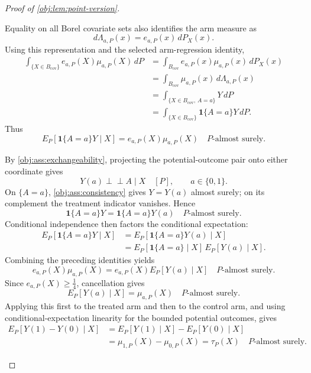 \documentclass[11pt]{article}
\begin{document}
\begin{proof}[Proof of \cref{obj:lem:point-version}]
\begin{enumerate}
Equality on all Borel covariate sets also identifies the arm measure as
\[
d\Lambda_{a,P}(x)=e_{a,P}(x)\,dP_X(x).
\]
Using this representation and the selected arm-regression identity,
\[
\begin{aligned}
\int_{\{X\in B_{\mathrm{cov}}\}}
e_{a,P}(X)\mu_{a,P}(X)\,dP
&=\int_{B_{\mathrm{cov}}}
e_{a,P}(x)\mu_{a,P}(x)\,dP_X(x)\\
&=\int_{B_{\mathrm{cov}}}\mu_{a,P}(x)\,d\Lambda_{a,P}(x)\\
&=\int_{\{X\in B_{\mathrm{cov}},\,A=a\}}Y\,dP\\
&=\int_{\{X\in B_{\mathrm{cov}}\}}\mathbf1\{A=a\}Y\,dP.
\end{aligned}
\]
Thus
\[
E_P[\mathbf1\{A=a\}Y\mid X]
=e_{a,P}(X)\mu_{a,P}(X)
\quad P\text{-almost surely}.
\]

By \cref{obj:ass:exchangeability}, projecting the potential-outcome pair onto either coordinate gives
\[
Y(a)\perp\!\!\!\perp A\mid X\quad[P],
\qquad a\in\{0,1\}.
\]
On \(\{A=a\}\), \cref{obj:ass:consistency} gives \(Y=Y(a)\) almost surely; on its complement the treatment indicator vanishes. Hence
\[
\mathbf1\{A=a\}Y
=\mathbf1\{A=a\}Y(a)
\quad P\text{-almost surely}.
\]
Conditional independence then factors the conditional expectation:
\[
\begin{aligned}
E_P[\mathbf1\{A=a\}Y\mid X]
&=E_P[\mathbf1\{A=a\}Y(a)\mid X]\\
&=E_P[\mathbf1\{A=a\}\mid X]\,
  E_P[Y(a)\mid X].
\end{aligned}
\]
Combining the preceding identities yields
\[
e_{a,P}(X)\mu_{a,P}(X)
=e_{a,P}(X)E_P[Y(a)\mid X]
\quad P\text{-almost surely}.
\]
Since \(e_{a,P}(X)\ge\tfrac14\), cancellation gives
\[
E_P[Y(a)\mid X]=\mu_{a,P}(X)
\quad P\text{-almost surely}.
\]
Applying this first to the treated arm and then to the control arm, and using conditional-expectation linearity for the bounded potential outcomes, gives
\[
\begin{aligned}
E_P[Y(1)-Y(0)\mid X]
&=E_P[Y(1)\mid X]-E_P[Y(0)\mid X]\\
&=\mu_{1,P}(X)-\mu_{0,P}(X)
=\tau_P(X)
\quad P\text{-almost surely}.
\end{aligned}
\] %


\end{enumerate}
\end{proof}
\end{document}
